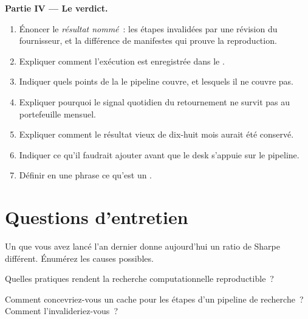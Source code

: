 \begin{problem}
\medskip\noindent\textbf{Partie IV --- Le verdict.}
\begin{enumerate}[resume]
\item Énoncer le \emph{résultat nommé}~: les étapes invalidées par une révision du fournisseur, et la différence de manifestes qui prouve la reproduction.
\item Expliquer comment l'exécution est enregistrée dans le .
\item Indiquer quels points de la  le pipeline couvre, et lesquels il ne couvre pas.
\item Expliquer pourquoi le signal quotidien du retournement ne survit pas au portefeuille mensuel.
\item Expliquer comment le résultat vieux de dix-huit mois aurait été conservé.
\item Indiquer ce qu'il faudrait ajouter avant que le desk s'appuie sur le pipeline.
\item Définir en une phrase ce qu'est un .
\end{enumerate}
\end{problem}

\section{Questions d'entretien}

\begin{interviewq}\label{iq:rs:build-a-research-workflow:1}
Un  que vous avez lancé l'an dernier donne aujourd'hui un ratio de Sharpe différent. Énumérez les causes possibles.
\end{interviewq}

\begin{interviewq}\label{iq:rs:build-a-research-workflow:2}
Quelles pratiques rendent la recherche computationnelle reproductible~?
\end{interviewq}

\begin{interviewq}\label{iq:rs:build-a-research-workflow:3}
Comment concevriez-vous un cache pour les étapes d'un pipeline de recherche~? Comment l'invalideriez-vous~?
\end{interviewq}


